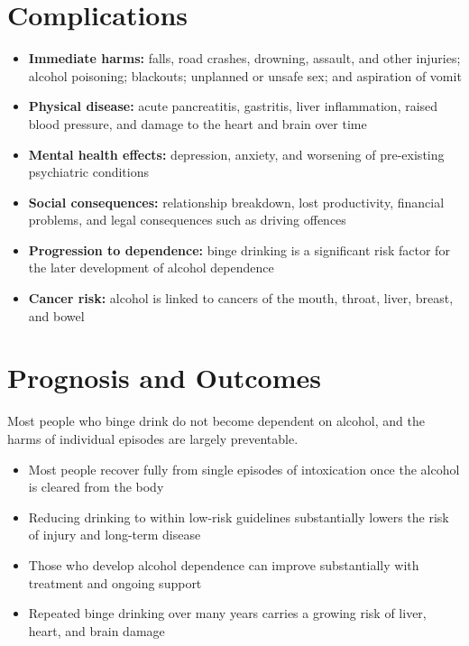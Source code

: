 \section*{Complications}
\begin{itemize}
    \item \textbf{Immediate harms:} falls, road crashes, drowning, assault, and other injuries; alcohol poisoning; blackouts; unplanned or unsafe sex; and aspiration of vomit
    \item \textbf{Physical disease:} acute pancreatitis, gastritis, liver inflammation, raised blood pressure, and damage to the heart and brain over time
    \item \textbf{Mental health effects:} depression, anxiety, and worsening of pre-existing psychiatric conditions
    \item \textbf{Social consequences:} relationship breakdown, lost productivity, financial problems, and legal consequences such as driving offences
    \item \textbf{Progression to dependence:} binge drinking is a significant risk factor for the later development of alcohol dependence
    \item \textbf{Cancer risk:} alcohol is linked to cancers of the mouth, throat, liver, breast, and bowel
\end{itemize}

\section*{Prognosis and Outcomes}
Most people who binge drink do not become dependent on alcohol, and the harms of individual episodes are largely preventable.

\begin{itemize}
    \item Most people recover fully from single episodes of intoxication once the alcohol is cleared from the body
    \item Reducing drinking to within low-risk guidelines substantially lowers the risk of injury and long-term disease
    \item Those who develop alcohol dependence can improve substantially with treatment and ongoing support
    \item Repeated binge drinking over many years carries a growing risk of liver, heart, and brain damage
\end{itemize}


